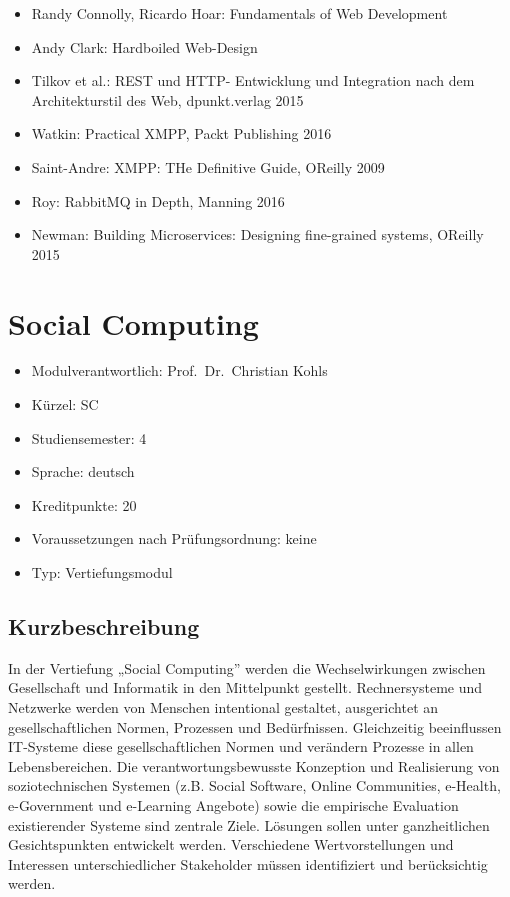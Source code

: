 \begin{itemize}
\tightlist
\item
  Randy Connolly, Ricardo Hoar: Fundamentals of Web Development
\item
  Andy Clark: Hardboiled Web-Design
\item
  Tilkov et al.: REST und HTTP- Entwicklung und Integration nach dem
  Architekturstil des Web, dpunkt.verlag 2015
\item
  Watkin: Practical XMPP, Packt Publishing 2016
\item
  Saint-Andre: XMPP: THe Definitive Guide, OReilly 2009
\item
  Roy: RabbitMQ in Depth, Manning 2016
\item
  Newman: Building Microservices: Designing fine-grained systems,
  OReilly 2015
\end{itemize}

\chapter{Social Computing}\label{social-computing}

\begin{itemize}
\tightlist
\item
  Modulverantwortlich: Prof.~Dr.~Christian Kohls
\item
  Kürzel: SC
\item
  Studiensemester: 4
\item
  Sprache: deutsch
\item
  Kreditpunkte: 20
\item
  Voraussetzungen nach Prüfungsordnung: keine
\item
  Typ: Vertiefungsmodul
\end{itemize}

\section*{Kurzbeschreibung}\label{kurzbeschreibung-6}

In der Vertiefung „Social Computing'' werden die Wechselwirkungen
zwischen Gesellschaft und Informatik in den Mittelpunkt gestellt.
Rechnersysteme und Netzwerke werden von Menschen intentional gestaltet,
ausgerichtet an gesellschaftlichen Normen, Prozessen und Bedürfnissen.
Gleichzeitig beeinflussen IT-Systeme diese gesellschaftlichen Normen und
verändern Prozesse in allen Lebensbereichen. Die verantwortungsbewusste
Konzeption und Realisierung von soziotechnischen Systemen (z.B. Social
Software, Online Communities, e-Health, e-Government und e-Learning
Angebote) sowie die empirische Evaluation existierender Systeme sind
zentrale Ziele. Lösungen sollen unter ganzheitlichen Gesichtspunkten
entwickelt werden. Verschiedene Wertvorstellungen und Interessen
unterschiedlicher Stakeholder müssen identifiziert und berücksichtig
werden.

